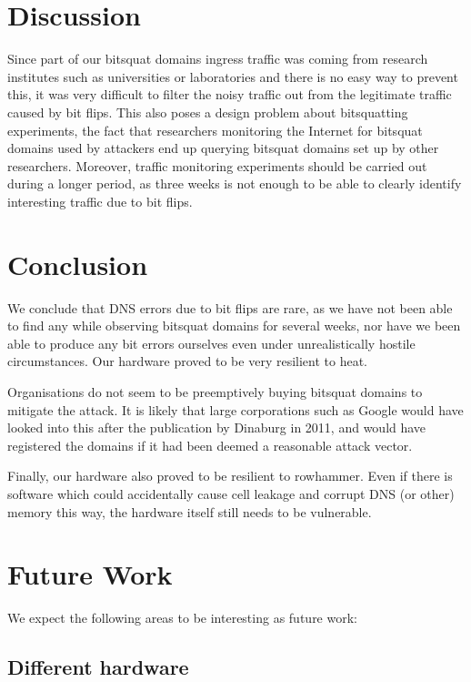 \documentclass[conference]{IEEEtran}
\begin{document}
\section{Discussion}\label{sec:disc}

Since part of our bitsquat domains ingress traffic was coming from
research institutes such as universities or laboratories and there is no easy
way to prevent this, it was very difficult to filter the noisy traffic out from
the legitimate traffic caused by bit flips. This also poses a design problem
about bitsquatting experiments, the fact that researchers monitoring the
Internet for bitsquat domains used by attackers end up querying
bitsquat domains set up by other researchers. Moreover, traffic monitoring
experiments should be carried out during a longer period, as three weeks is not
enough to be able to clearly identify interesting traffic due to bit flips.


\section{Conclusion}\label{sec:conc}

We conclude that DNS errors due to bit flips are rare, as we have not been able
to find any while observing bitsquat domains for several weeks, nor have we
been able to produce any bit errors ourselves even under unrealistically
hostile circumstances. Our hardware proved to be very resilient to heat.

Organisations do not seem to be preemptively buying bitsquat domains to
mitigate the attack. It is likely that large corporations such as Google would
have looked into this after the publication by Dinaburg in 2011, and would have
registered the domains if it had been deemed a reasonable attack vector.

Finally, our hardware also proved to be resilient to rowhammer. Even if there is
software which could accidentally cause cell leakage and corrupt DNS (or other)
memory this way, the hardware itself still needs to be vulnerable.


\section{Future Work}\label{sec:futwork}

We expect the following areas to be interesting as future work:

\subsection{Different hardware}
\end{document}

